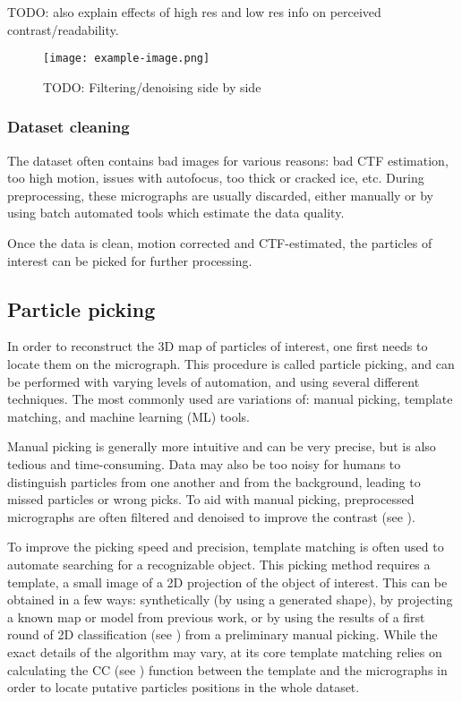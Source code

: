 TODO: also explain effects of high res and low res info on perceived contrast/readability.

\begin{figure}[ht]
    \centering
    \texttt{[image: example-image.png]}
    \caption{TODO: Filtering/denoising side by side}
    \label{fig:filtering}
\end{figure}

\subsubsection{Dataset cleaning}
The dataset often contains bad images for various reasons: bad CTF estimation, too high motion, issues with autofocus, too thick or cracked ice, etc.
During preprocessing, these micrographs are usually discarded, either manually or by using batch automated tools which estimate the data quality.

Once the data is clean, motion corrected and CTF-estimated, the particles of interest can be picked for further processing.

\subsection{Particle picking}\label{particle_picking}
In order to reconstruct the 3D map of particles of interest, one first needs to locate them on the micrograph.
This procedure is called particle picking, and can be performed with varying levels of automation, and using several different techniques.
The most commonly used are variations of: manual picking, template matching, and machine learning (ML) tools.

Manual picking is generally more intuitive and can be very precise, but is also tedious and time-consuming.
Data may also be too noisy for humans to distinguish particles from one another and from the background, leading to missed particles or wrong picks.
To aid with manual picking, preprocessed micrographs are often filtered and denoised to improve the contrast (see ).

To improve the picking speed and precision, template matching is often used to automate searching for a recognizable object.
This picking method requires a template, a small image of a 2D projection of the object of interest.
This can be obtained in a few ways: synthetically (by using a generated shape), by projecting a known map or model from previous work, or by using the results of a first round of 2D classification (see ) from a preliminary manual picking.
While the exact details of the algorithm may vary, at its core template matching relies on calculating the CC (see ) function between the template and the micrographs in order to locate putative particles positions in the whole dataset.

